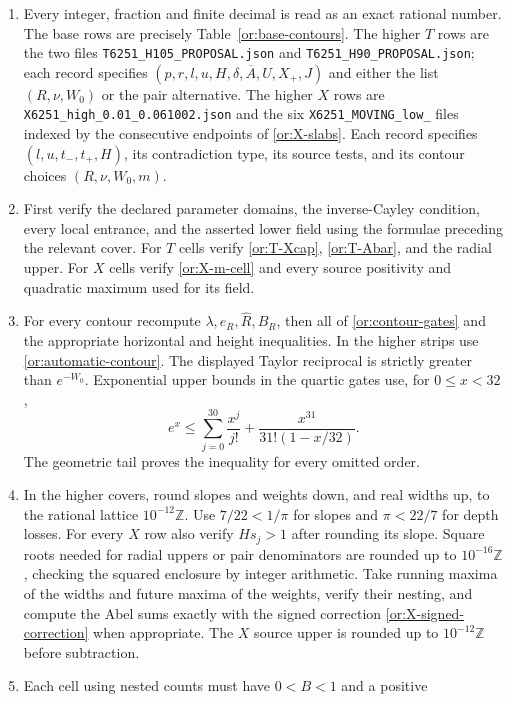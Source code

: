\documentclass[11pt,reqno]{amsart}
\numberwithin{equation}{section}
\theoremstyle{definition}
\theoremstyle{remark}
\DeclareRobustCommand{\cert}[1]{\nolinkurl{#1}}
\begin{document}
\begin{enumerate}
\item Every integer, fraction and finite decimal is read as an exact
  rational number.  The base rows are precisely
  Table~\ref{or:base-contours}.  The higher $T$ rows are the two files
  \cert{T6251_H105_PROPOSAL.json} and
  \cert{T6251_H90_PROPOSAL.json}; each record specifies
  $(p,r,l,u,H,\delta,\overline A,U,X_+,J)$ and either the list
  $(R,\nu,W_0)$ or the pair alternative.  The higher $X$ rows are
  \cert{X6251_high_0.01_0.061002.json} and the six
  \cert{X6251_MOVING_low_} files indexed by the consecutive endpoints
  of \eqref{or:X-slabs}.  Each record specifies $(l,u,t_-,t_+,H)$,
  its contradiction type, its source tests, and its contour choices
  $(R,\nu,W_0,m)$.
\item First verify the declared parameter domains, the inverse-Cayley
  condition, every local entrance, and the asserted lower
  field using the formulae preceding the relevant cover.  For $T$
  cells verify \eqref{or:T-Xcap}, \eqref{or:T-Abar}, and the
  radial upper.  For $X$ cells verify \eqref{or:X-m-cell} and every
  source positivity and quadratic maximum used for its field.
\item For every contour recompute $\lambda,e_R,\widehat R,B_R$,
  then all of \eqref{or:contour-gates} and the appropriate horizontal
  and height inequalities.  In the higher strips use
  \eqref{or:automatic-contour}.  The displayed Taylor reciprocal is
  strictly greater than $e^{-W_0}$.  Exponential upper bounds in the
  quartic gates use, for $0\le x<32$,
  \[
    e^x\le\sum_{j=0}^{30}\frac{x^j}{j!}
           +\frac{x^{31}}{31!(1-x/32)}.
  \]
  The geometric tail proves the inequality for every omitted order.
\item In the higher covers, round slopes and weights down, and real
  widths up, to the rational lattice $10^{-12}\mathbb Z$.
  Use $7/22<1/\pi$ for slopes and $\pi<22/7$ for depth losses.
  For every $X$ row also verify $Hs_j>1$ after rounding its slope.
  Square roots needed for radial uppers or pair denominators are
  rounded up to $10^{-16}\mathbb Z$, checking the squared enclosure
  by integer arithmetic.  Take running maxima of the widths and
  future maxima of the weights, verify their nesting, and compute
  the Abel sums exactly with the signed correction
  \eqref{or:X-signed-correction} when appropriate.  The $X$ source
  upper is rounded up to $10^{-12}\mathbb Z$ before subtraction.
\item Each cell using nested counts must have $0<B<1$ and a positive

\end{enumerate}
\end{document}
